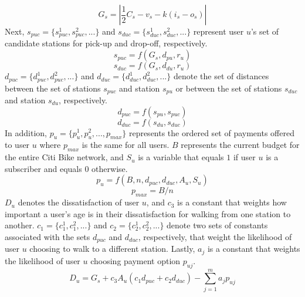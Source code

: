 \documentclass[times, 10pt,twocolumn]{article}
\begin{document}
\begin{equation}
G_s = |\frac{1}{2}C_s - v_s - k(i_s - o_s)|
\end{equation}
Next, $s_{puc} = \{s_{puc}^1, s_{puc}^2, ...\}$ and $s_{duc} = \{s_{duc}^1, s_{duc}^2, ...\}$ represent user $u$'s set of candidate stations for pick-up and drop-off, respectively.
\begin{equation}
s_{puc} = f(G_s, d_{pu}, r_u)
\end{equation}
\begin{equation}
s_{duc} = f(G_s, d_{du}, r_u)
\end{equation}
$d_{puc} = \{d_{puc}^1, d_{puc}^2, ...\}$ and $d_{duc} = \{d_{duc}^1, d_{duc}^2, ...\}$ denote the set of distances between the set of stations $s_{puc}$ and station $s_{pu}$ or between the set of stations $s_{duc}$ and station $s_{du}$, respectively.
\begin{equation}
d_{puc} = f(s_{pu}, s_{puc})
\end{equation}
\begin{equation}
d_{duc} = f(s_{du}, s_{duc})
\end{equation}
In addition, $p_u = \{p_u^1, p_u^2, ..., p_{max}\}$ represents the ordered set of payments offered to user $u$ where $p_{max}$ is the same for all users. $B$ represents the current budget for the entire Citi Bike network, and $S_u$ is a variable that equals $1$ if user $u$ is a subscriber and equals $0$ otherwise.
\begin{equation}
p_u = f(B, n, d_{puc}, d_{duc}, A_u, S_u)
\end{equation}
\begin{equation}
p_{max} = B/n
\end{equation}
$D_u$ denotes the dissatisfaction of user $u$, and $c_3$ is a constant that weights how important a user's age is in their dissatisfaction for walking from one station to another. $c_1 = \{c_1^1, c_1^2, ...\}$ and $c_2 = \{c_2^1, c_2^2, ...\}$ denote two sets of constants associated with the sets $d_{puc}$ and $d_{duc}$, respectively, that weight the likelihood of user $u$ choosing to walk to a different station. Lastly, $a_j$ is a constant that weights the likelihood of user $u$ choosing payment option $p_{uj}$.
\begin{equation}
D_u = G_s + c_3A_u(c_1d_{puc} + c_2d_{duc}) - \sum_{j=1}^{m}a_jp_{uj}
\end{equation}
\end{document}
